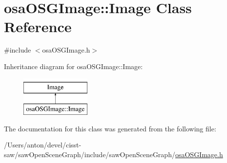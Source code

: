 \hypertarget{classosa_o_s_g_image_1_1_image}{}\section{osa\+O\+S\+G\+Image\+:\+:Image Class Reference}
\label{classosa_o_s_g_image_1_1_image}


{\ttfamily \#include $<$osa\+O\+S\+G\+Image.\+h$>$}

Inheritance diagram for osa\+O\+S\+G\+Image\+:\+:Image\+:\begin{figure}[H]
\begin{center}
\leavevmode
\includegraphics[height=2.000000cm]{d0/d80/classosa_o_s_g_image_1_1_image}
\end{center}
\end{figure}


The documentation for this class was generated from the following file\+:\begin{DoxyCompactItemize}
\item 
/\+Users/anton/devel/cisst-\/saw/saw\+Open\+Scene\+Graph/include/saw\+Open\+Scene\+Graph/\hyperlink{osa_o_s_g_image_8h}{osa\+O\+S\+G\+Image.\+h}\end{DoxyCompactItemize}
